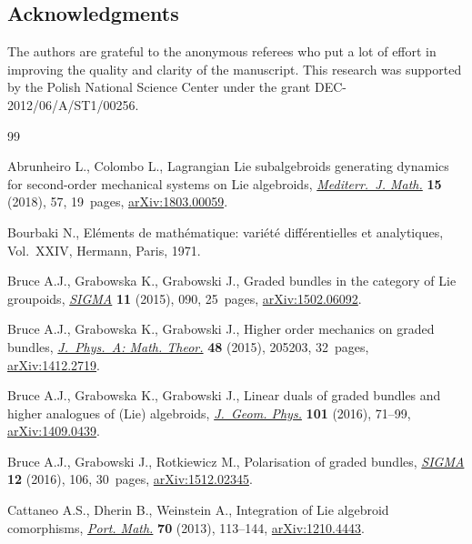 \documentclass[10pt,a4paper]{amsart}
\numberwithin{equation}{section}
\theoremstyle{definition}
\begin{document}
\subsection*{Acknowledgments}
The authors are grateful to the anonymous referees who put a lot of effort in improving the quality and clarity of the manuscript. This research was supported by the Polish National Science Center under the grant DEC-2012/06/A/ST1/00256.


\begin{thebibliography}{99}
\footnotesize\itemsep=0pt

Abrunheiro L., Colombo L., Lagrangian {L}ie subalgebroids generating dynamics
 for second-order mechanical systems on {L}ie algebroids, \href{https://doi.org/10.1007/s00009-018-1108-x}{\textit{Mediterr.~J.
 Math.}} \textbf{15} (2018), 57, 19~pages, \href{https://arxiv.org/abs/1803.00059}{arXiv:1803.00059}.

Bourbaki N., El\'ements de math\'ematique: vari\'et\'e diff\'erentielles et
 analytiques, Vol.~XXIV, Hermann, Paris, 1971.

Bruce A.J., Grabowska K., Grabowski J., Graded bundles in the category of {L}ie
 groupoids, \href{https://doi.org/10.3842/SIGMA.2015.090}{\textit{SIGMA}} \textbf{11} (2015), 090, 25~pages,
 \href{https://arxiv.org/abs/1502.06092}{arXiv:1502.06092}.

Bruce A.J., Grabowska K., Grabowski J., Higher order mechanics on graded
 bundles, \href{https://doi.org/10.1088/1751-8113/48/20/205203}{\textit{J.~Phys.~A: Math. Theor.}} \textbf{48} (2015), 205203,
 32~pages, \href{https://arxiv.org/abs/1412.2719}{arXiv:1412.2719}.

Bruce A.J., Grabowska K., Grabowski J., Linear duals of graded bundles and
 higher analogues of ({L}ie) algebroids, \href{https://doi.org/10.1016/j.geomphys.2015.12.004}{\textit{J.~Geom. Phys.}} \textbf{101}
 (2016), 71--99, \href{https://arxiv.org/abs/1409.0439}{arXiv:1409.0439}.

Bruce A.J., Grabowski J., Rotkiewicz M., Polarisation of graded bundles,
 \href{https://doi.org/10.3842/SIGMA.2016.106}{\textit{SIGMA}} \textbf{12} (2016), 106, 30~pages, \href{https://arxiv.org/abs/1512.02345}{arXiv:1512.02345}.

Cattaneo A.S., Dherin B., Weinstein A., Integration of {L}ie algebroid
 comorphisms, \href{https://doi.org/10.4171/PM/1928}{\textit{Port. Math.}} \textbf{70} (2013), 113--144,
 \href{https://arxiv.org/abs/1210.4443}{arXiv:1210.4443}.


\end{thebibliography}
\end{document}
